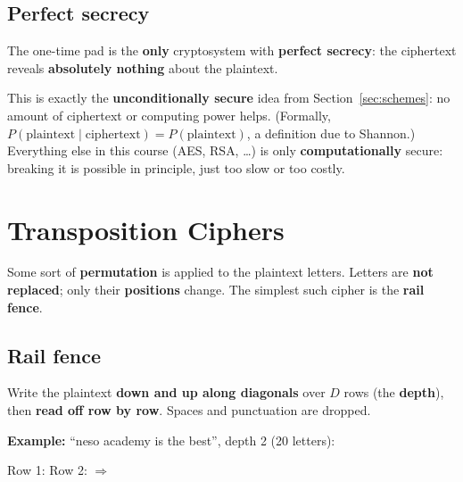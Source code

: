\subsection{Perfect secrecy}
\begin{keybox}
The one-time pad is the \textbf{only} cryptosystem with \textbf{perfect secrecy}: the ciphertext reveals \textbf{absolutely nothing} about the plaintext.
\end{keybox}
This is exactly the \textbf{unconditionally secure} idea from Section~\ref{sec:schemes}: no amount of ciphertext or computing power helps. (Formally, $P(\text{plaintext} \mid \text{ciphertext}) = P(\text{plaintext})$, a definition due to Shannon.)
Everything else in this course (AES, RSA, \dots) is only \textbf{computationally} secure: breaking it is possible in principle, just too slow or too costly.

\section{Transposition Ciphers}

\begin{keybox}
Some sort of \textbf{permutation} is applied to the plaintext letters. Letters are \textbf{not replaced}; only their \textbf{positions} change. The simplest such cipher is the \textbf{rail fence}.
\end{keybox}

\subsection{Rail fence}
Write the plaintext \textbf{down and up along diagonals} over $D$ rows (the \textbf{depth}), then \textbf{read off row by row}. Spaces and punctuation are dropped.

\textbf{Example:} ``neso academy is the best'', depth 2 (20 letters):
\begin{center}
\end{center}
Row 1: \quad Row 2: \quad $\Rightarrow$\quad \textbf{}

